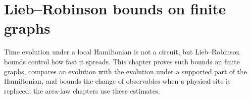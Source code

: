\chapter{Lieb--Robinson bounds on finite graphs}
\label{ch:circuits_lieb_robinson}

Time evolution under a local Hamiltonian is not a circuit, but Lieb--Robinson
bounds control how fast it spreads. This chapter proves such bounds on finite
graphs, compares an evolution with the evolution under a supported part of the
Hamiltonian, and bounds the change of observables when a physical site is
replaced; the area-law chapters use these estimates.






